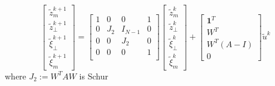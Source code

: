 \documentclass{book}
\newcommand{\fatone}{\boldsymbol{1}}
\theoremstyle{theoremv2}
\theoremstyle{defv2}
\theoremstyle{remark}
\theoremstyle{remark}
\theoremstyle{definition}
\theoremstyle{definition}
\begin{document}
\[
    \begin{bmatrix}
        \tilde{z}^{k+1}_m \\ \tilde{z}^{k+1}_\perp \\ \tilde{\xi}^{k+1}_\perp \\ \tilde{\xi}^{k+1}_m
    \end{bmatrix} = \begin{bmatrix}
        1 & 0 & 0 & 1 \\ 
        0 & J_2 & I_{N-1} & 0\\
        0 & 0 & J_2 & 0 \\
        0 & 0 & 0 & 1 \\
    \end{bmatrix} \begin{bmatrix}
        \tilde{z}^{k}_m \\ \tilde{z}^{k}_\perp \\ \tilde{\xi}^{k}_\perp \\ \tilde{\xi}^{k}_m
    \end{bmatrix} + \begin{bmatrix}
        \fatone^T \\ W^T \\ W^T(A-I) \\ 0
    \end{bmatrix} \tilde{u}^k
\]
where $J_2:= W^TAW$ is Schur
\end{document}
